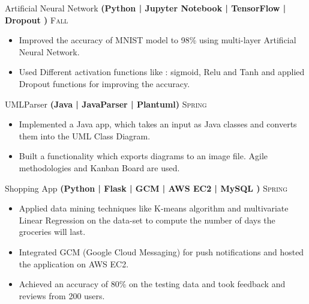 \documentclass[10pt,a4paper]{article}
\begin{document}
{{\headedsection  %
  {{Artificial Neural Network}
  \textbf{
  \small{(Python | Jupyter Notebook | TensorFlow | Dropout )}}}
  {\textsc{ Fall }} {%
  
    {\bodytext
    {
    \begin{itemize}
        \item Improved the accuracy of MNIST model to 98\% using multi-layer Artificial Neural Network.
        \item Used Different activation functions like : sigmoid, Relu and Tanh and applied Dropout functions for improving the accuracy.
        
    \end{itemize}}}
}


\headedsection  %
  {{UMLParser}
  \textbf{
  \small{(Java | JavaParser | Plantuml)}}}
  {\textsc{Spring }} {%
  
    {\bodytext
    {
    \begin{itemize}
        \item  Implemented a Java app, which takes an input as Java classes and converts them into the UML Class Diagram.
        \item Built a functionality which exports diagrams to an image file. Agile methodologies and Kanban Board are used.
    \end{itemize}}}
}


\headedsection  %
 {{Shopping App}
  \textbf{
  \small{(Python | Flask | GCM | AWS EC2 | MySQL )}}}
  {\textsc{Spring }} {%
  
    {\bodytext
    {
    \begin{itemize}
        \item Applied data mining techniques like K-means algorithm and multivariate Linear Regression on the data-set to compute the number of days the groceries will last.
        \item Integrated GCM (Google Cloud Messaging) for push notifications  and hosted  the application on AWS EC2.
        \item Achieved an accuracy of 80\% on the testing data and took feedback and reviews from 200 users.
        
    \end{itemize}}}
}


}

\spacedhrule{0.0em}{-0.4em}


}
\end{document}

